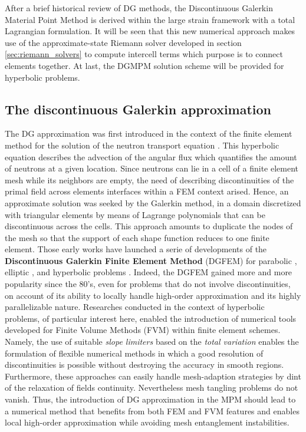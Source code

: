 After a brief historical review of DG methods, the Discontinuous Galerkin Material Point Method is derived within the large strain framework with a total Lagrangian formulation. It will be seen that this new numerical approach makes use of the approximate-state Riemann solver developed in section \ref{sec:riemann_solvers} to compute intercell terms which purpose is to connect elements together. At last, the DGMPM solution scheme will be provided for hyperbolic problems.

\subsection{The discontinuous Galerkin approximation}
The DG approximation was first introduced in the context of the finite element method for the solution of the neutron transport equation \cite{NeutronDG}. This hyperbolic equation describes the advection of the angular flux which quantifies the amount of neutrons at a given location. Since neutrons can lie in a cell of a finite element mesh while its neighbors are empty, the need of describing discontinuities of the primal field across elements interfaces within a FEM context arised. Hence, an approximate solution was seeked by the Galerkin method, in a domain discretized with triangular elements by means of Lagrange polynomials that can be discontinuous across the cells. This approach amounts to duplicate the nodes of the mesh so that the support of each shape function reduces to one finite element. Those early works have launched a serie of developments of the \textbf{Discontinuous Galerkin Finite Element Method} (DGFEM) for parabolic \cite{Arnold_IPM}, elliptic \cite{Hansbo_DGsolid,Noel_HEDG}, and hyperbolic problems \cite{Cockburn}. Indeed, the DGFEM gained more and more popularity since the 80's, even for problems that do not involve discontinuities, on account of its ability to locally handle high-order approximation and its highly parallelizable nature. 
Researches conducted in the context of hyperbolic problems, of particular interest here, enabled the introduction of numerical tools developed for Finite Volume Methods (FVM) within finite element schemes.
Namely, the use of suitable \textit{slope limiters} \cite{vanLeer_Limiters} based on the \textit{total variation} \cite{Harten_TVD} enables the formulation of flexible numerical methods in which a good resolution of discontinuities is possible without destroying the accuracy in smooth regions. Furthermore, these approaches can easily handle mesh-adaption strategies by dint of the relaxation of fields continuity. Nevertheless mesh tangling problems do not vanish.
Thus, the introduction of DG approximation in the MPM should lead to a numerical method that benefits from both FEM and FVM features and enables local high-order approximation while avoiding mesh entanglement instabilities.


